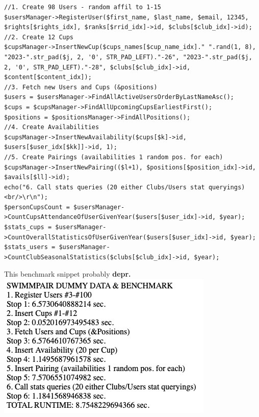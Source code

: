 \begin{lstlisting}
//1. Create 98 Users - random affil to 1-15
$usersManager->RegisterUser($first_name, $last_name, $email, 12345, $rights[$rights_idx], $ranks[$rrid_idx]->id, $clubs[$club_idx]->id);
//2. Create 12 Cups
$cupsManager->InsertNewCup($cups_names[$cup_name_idx]." ".rand(1, 8), "2023-".str_pad($j, 2, '0', STR_PAD_LEFT)."-26", "2023-".str_pad($j, 2, '0', STR_PAD_LEFT)."-28", $clubs[$club_idx]->id, $content[$content_idx]);
//3. Fetch new Users and Cups (&positions)
$users = $usersManager->FindAllActiveUsersOrderByLastNameAsc();
$cups = $cupsManager->FindAllUpcomingCupsEarliestFirst();
$positions = $positionsManager->FindAllPositions();
//4. Create Availabilities
$cupsManager->InsertNewAvailability($cups[$k]->id, $users[$user_idx[$kk]]->id, 1);
//5. Create Pairings (availabilities 1 random pos. for each)
$cupsManager->InsertNewPairing(($l+1), $positions[$position_idx]->id, $avails[$ll]->id);
echo("6. Call stats queries (20 either Clubs/Users stat queryings)<br/>\r\n");
$personCupsCount = $usersManager->CountCupsAttendanceOfUserGivenYear($users[$user_idx]->id, $year);
$stats_cups = $usersManager->CountOverallStatisticsOfUserGivenYear($users[$user_idx]->id, $year);
$stats_users = $usersManager->CountClubSeasonalStatistics($clubs[$club_idx]->id, $year);
\end{lstlisting}
This benchmark snippet probably \textbf{depr.}
\newline
\includegraphics[scale=0.707]{img/app-benchmarking.png}